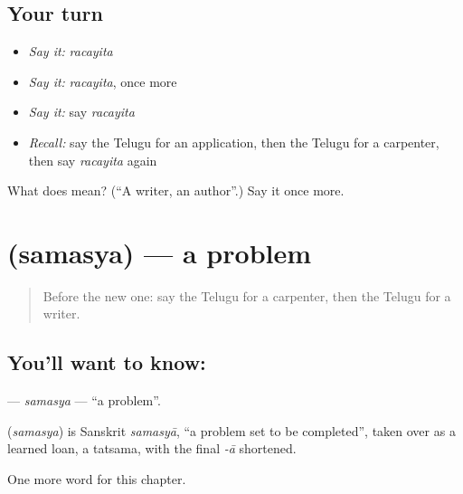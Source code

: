 \subsection*{Your turn}
\begin{itemize}
\raggedright
  \item \emph{Say it:} \emph{racayita}
  \item \emph{Say it:} \emph{racayita}, once more
  \item \emph{Say it:} say \emph{racayita}
  \item \emph{Recall:} say the Telugu for an application, then the Telugu for a carpenter, then say \emph{racayita} again
\end{itemize}

\begin{tcolorbox}[breakable,colback=teal!4,colframe=teal!35!black,title={Before you move on}]
What does  mean? (\textquotedblleft{}A writer, an author\textquotedblright{}.) Say it once more.
\end{tcolorbox}
\section[\texorpdfstring{\te{సమస్య} (samasya)}{సమస్య (samasya)}]{ (samasya) — a problem}

\label{lesson:TE-C197-samasya}



\begin{quote}
Before the new one: say the Telugu for a carpenter, then the Telugu for a writer.
\end{quote}

\subsection*{You'll want to know: }
\textbf{} — \emph{samasya} — \textquotedblleft{}a problem\textquotedblright{}.

\begin{cousinweb}
\textbf{} (\emph{samasya}) is Sanskrit \emph{samasyā}, \textquotedblleft{}a problem set to be completed\textquotedblright{}, taken over as a learned loan, a tatsama, with the final \emph{-ā} shortened.
\end{cousinweb}

\begin{grammarlens}[title={What you've built}]
One more word for this chapter.
\end{grammarlens}

